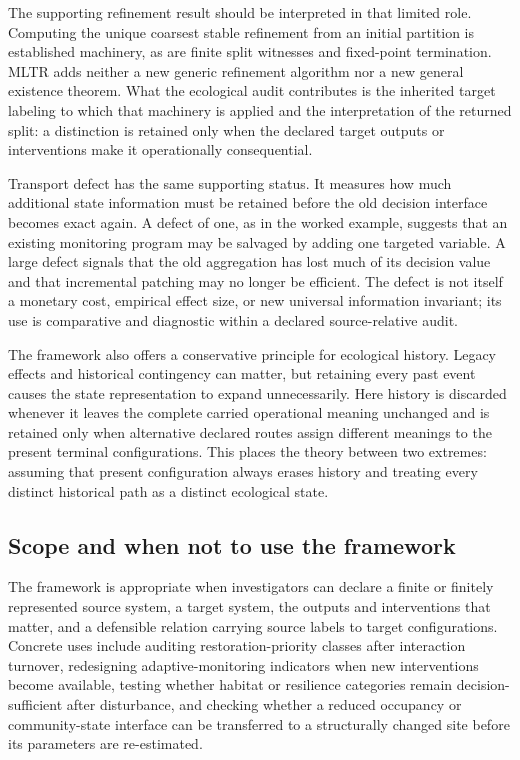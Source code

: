 \documentclass[11pt]{article}
\begin{document}
The supporting refinement result should be interpreted in that limited role. Computing the unique coarsest stable refinement from an initial partition is established machinery, as are finite split witnesses and fixed-point termination. MLTR adds neither a new generic refinement algorithm nor a new general existence theorem. What the ecological audit contributes is the inherited target labeling to which that machinery is applied and the interpretation of the returned split: a distinction is retained only when the declared target outputs or interventions make it operationally consequential.

Transport defect has the same supporting status. It measures how much additional state information must be retained before the old decision interface becomes exact again. A defect of one, as in the worked example, suggests that an existing monitoring program may be salvaged by adding one targeted variable. A large defect signals that the old aggregation has lost much of its decision value and that incremental patching may no longer be efficient. The defect is not itself a monetary cost, empirical effect size, or new universal information invariant; its use is comparative and diagnostic within a declared source-relative audit.

The framework also offers a conservative principle for ecological history. Legacy effects and historical contingency can matter, but retaining every past event causes the state representation to expand unnecessarily. Here history is discarded whenever it leaves the complete carried operational meaning unchanged and is retained only when alternative declared routes assign different meanings to the present terminal configurations. This places the theory between two extremes: assuming that present configuration always erases history and treating every distinct historical path as a distinct ecological state.

\subsection{Scope and when not to use the framework}
The framework is appropriate when investigators can declare a finite or finitely represented source system, a target system, the outputs and interventions that matter, and a defensible relation carrying source labels to target configurations. Concrete uses include auditing restoration-priority classes after interaction turnover, redesigning adaptive-monitoring indicators when new interventions become available, testing whether habitat or resilience categories remain decision-sufficient after disturbance, and checking whether a reduced occupancy or community-state interface can be transferred to a structurally changed site before its parameters are re-estimated.
\end{document}
